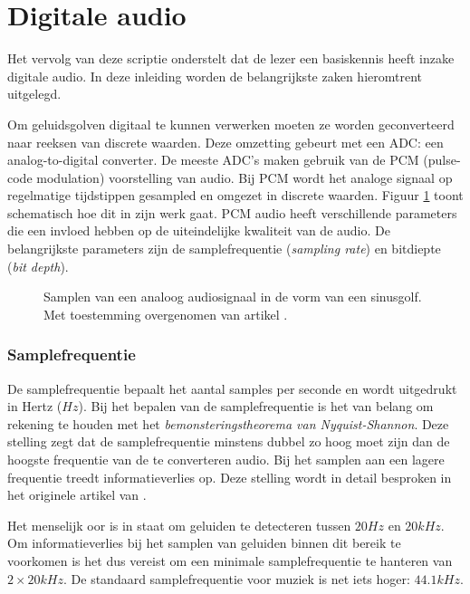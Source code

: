 \section{Digitale audio}

Het vervolg van deze scriptie onderstelt dat de lezer een basiskennis heeft inzake digitale audio. In deze inleiding worden de belangrijkste zaken hieromtrent uitgelegd.

Om geluidsgolven digitaal te kunnen verwerken moeten ze worden geconverteerd naar reeksen van discrete waarden. Deze omzetting gebeurt met een ADC: een analog-to-digital converter. De meeste ADC's maken gebruik van de PCM (pulse-code modulation) voorstelling van audio. Bij PCM wordt het analoge signaal op regelmatige tijdstippen gesampled en omgezet in discrete waarden. Figuur \ref{sampling} toont schematisch hoe dit in zijn werk gaat. PCM audio heeft verschillende parameters die een invloed hebben op de uiteindelijke kwaliteit van de audio. De belangrijkste parameters zijn de samplefrequentie (\textit{sampling rate}) en bitdiepte (\textit{bit depth}).

\begin{figure}[h!]
	\captionsetup{width=0.7\textwidth}
	\caption[Samplen van audio]{Samplen van een analoog audiosignaal in de vorm van een sinusgolf. Met toestemming overgenomen van artikel \cite{tarsosmanual2016}.}
	\begin{center}
		\advance\parskip0.3cm
		
	\end{center}
	\label{sampling}
\end{figure}

\subsubsection{Samplefrequentie}

De samplefrequentie bepaalt het aantal samples per seconde en wordt uitgedrukt in Hertz ($Hz$). Bij het bepalen van de samplefrequentie is het van belang om rekening te houden met het \textit{bemonsteringstheorema van Nyquist-Shannon}. Deze stelling zegt dat de samplefrequentie minstens dubbel zo hoog moet zijn dan de hoogste frequentie van de te converteren audio. Bij het samplen aan een lagere frequentie treedt informatieverlies op. Deze stelling wordt in detail besproken in het originele artikel \cite{nyquist1928certain} van \citeauthor{nyquist1928certain}.

Het menselijk oor is in staat om geluiden te detecteren tussen $20Hz$ en $20kHz$. Om informatieverlies bij het samplen van geluiden binnen dit bereik te voorkomen is het dus vereist om een minimale samplefrequentie te hanteren van $ 2 \times 20kHz $. De standaard samplefrequentie voor muziek is net iets hoger: $ 44.1kHz $.

